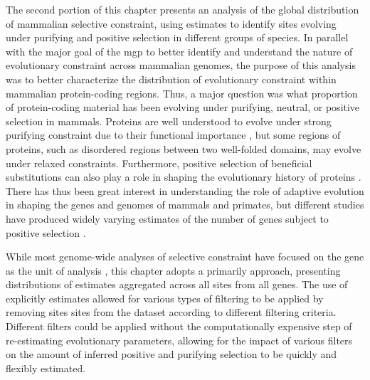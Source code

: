 The second portion of this chapter presents an analysis of the global
distribution of mammalian selective constraint, using \sw estimates to
identify sites evolving under purifying and positive selection in
different groups of species. In parallel with the major goal of the
\ac{mgp} to better identify and understand the nature of evolutionary
constraint across mammalian genomes, the purpose of this analysis was
to better characterize the distribution of evolutionary constraint
within mammalian protein-coding regions. Thus, a major question was
what proportion of protein-coding material has been evolving under
purifying, neutral, or positive selection in mammals. Proteins are
well understood to evolve under strong purifying constraint due to
their functional importance \citep{Fay2003}, but some regions of
proteins, such as disordered regions between two well-folded domains,
may evolve under relaxed constraints. Furthermore, positive selection
of beneficial substitutions can also play a role in shaping the
evolutionary history of proteins \citep{Pal2006}. There has thus been
great interest in understanding the role of adaptive evolution in
shaping the genes and genomes of mammals and primates, but different
studies have produced widely varying estimates of the number of genes
subject to positive selection \citep{MarquesBonet2009a,Ellegren2008}.

While most genome-wide analyses of selective constraint have focused
on the gene as the unit of analysis
\citep{Nielsen2005,Sequencing2005a,Kosiol2008}, this chapter adopts a
primarily \sw approach, presenting distributions of \sw estimates
aggregated across all sites from all genes. The use of explicitly \sw
estimates allowed for various types of filtering to be applied by
removing sites sites from the dataset according to different filtering
criteria. Different \sw filters could be applied without the
computationally expensive step of re-estimating evolutionary
parameters, allowing for the impact of various filters on the amount
of inferred positive and purifying selection to be quickly and
flexibly estimated.

